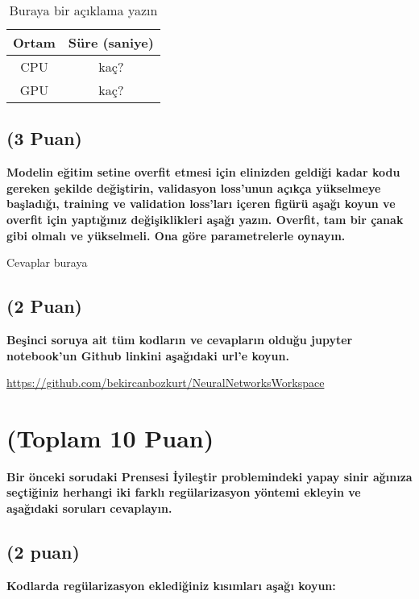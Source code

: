 \documentclass[11pt]{article}
\begin{document}
\begin{table}[ht!]
    \centering
    \caption{Buraya bir açıklama yazın}
    \begin{tabular}{c|c}
        Ortam & Süre (saniye) \\\hline
        CPU & kaç? \\
        GPU & kaç?\\
    \end{tabular}
    \label{tab:my_table}
\end{table}

\subsection{(3 Puan)} \textbf{Modelin eğitim setine overfit etmesi için elinizden geldiği kadar kodu gereken şekilde değiştirin, validasyon loss'unun açıkça yükselmeye başladığı, training ve validation loss'ları içeren figürü aşağı koyun ve overfit için yaptığınız değişiklikleri aşağı yazın. Overfit, tam bir çanak gibi olmalı ve yükselmeli. Ona göre parametrelerle oynayın.}

Cevaplar buraya

\begin{comment}
\begin{figure}[ht!]
    \centering
    \texttt{[image: mypicturehere.png]}
    \caption{Buraya açıklama yazın}
    \label{fig:my_pic}
\end{figure}
\end{comment}

\subsection{(2 Puan)} \textbf{Beşinci soruya ait tüm kodların ve cevapların olduğu jupyter notebook'un Github linkini aşağıdaki url'e koyun.}

\url{https://github.com/bekircanbozkurt/NeuralNetworksWorkspace}

\section{(Toplam 10 Puan)} \textbf{Bir önceki sorudaki Prensesi İyileştir problemindeki yapay sinir ağınıza seçtiğiniz herhangi iki farklı regülarizasyon yöntemi ekleyin ve aşağıdaki soruları cevaplayın.} 

\subsection{(2 puan)} \textbf{Kodlarda regülarizasyon eklediğiniz kısımları aşağı koyun:} 
\end{document}
